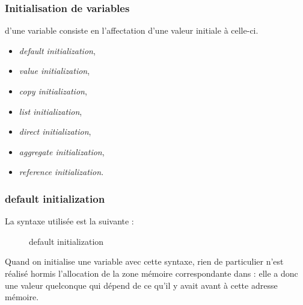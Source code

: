 \documentclass{cppcourses}
\begin{document}
\begin{frame}

\frametitle{Initialisation de variables}

 d'une variable consiste en l'affectation d'une valeur initiale à celle-ci.


\begin{itemize}
    \item<3-> \alert<10->{\emph{default initialization}},
    \item<4-> \alert<10->{\emph{value initialization}},
    \item<5-> \alert<10->{\emph{copy initialization}},
    \item<6-> \alert<10->{\emph{list initialization}},
    \item<7->\emph{direct initialization},
    \item<8-> \emph{aggregate initialization},
    \item<9-> \emph{reference initialization}.
\end{itemize}


\end{frame}

\begin{frame}

\frametitle{default initialization}

La syntaxe utilisée est la suivante :

\begin{figure}
\mykeyword{\textcolor{red}{<type>} \textcolor{blue}{<identifiant>};}
\caption{default initialization}
\end{figure}

Quand on initialise une variable avec cette syntaxe, rien de particulier n'est réalisé hormis l'allocation de la zone mémoire correspondante dans  : elle a donc une valeur quelconque qui dépend de ce qu'il y avait avant à cette adresse mémoire.

\end{frame}
\end{document}
